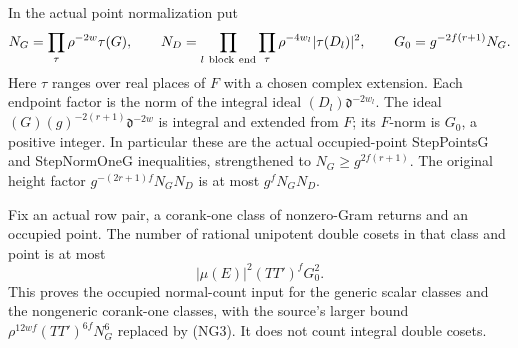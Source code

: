 In the actual point normalization put
\[
 N_G=\prod_\tau\rho^{-2w}\tau(G),\qquad
 N_D=\prod_{l\ {\rm block\ end}}\prod_\tau
              \rho^{-4w_l}|\tau(D_l)|^2,\qquad
 G_0=g^{-2f(r+1)}N_G.
\]
Here \(\tau\) ranges over real places of \(F\) with a chosen
complex extension. Each endpoint factor is the norm of the
integral ideal \((D_l)\mathfrak d^{-2w_l}\).
The ideal \((G)(g)^{-2(r+1)}\mathfrak d^{-2w}\) is integral
and extended from \(F\); its \(F\)-norm is \(G_0\), a positive
integer. In particular these are the actual occupied-point
StepPointsG and StepNormOneG inequalities, strengthened to
\(N_G\ge g^{2f(r+1)}\). The original height factor
\(g^{-(2r+1)f}N_GN_D\) is at most \(g^fN_GN_D\).

\begin{theorem}
\label{thm:nonzero-gram-normal-count}
Fix an actual row pair, a corank-one class of nonzero-Gram
returns and an occupied point. The number of rational
unipotent double cosets in that class and point is at most
\[
             |\mu(E)|^2(TT')^fG_0^2 .                     \tag{NG3}
\]
This proves the occupied normal-count input for the generic
scalar classes and the nongeneric corank-one classes, with
the source's larger bound
\(\rho^{12wf}(TT')^{6f}N_G^6\) replaced by (NG3).
It does not count integral double cosets.
\end{theorem}
